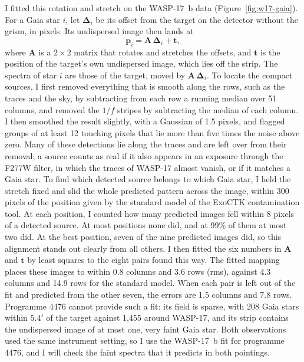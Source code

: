I fitted this rotation and stretch on the WASP-17~b data
(Figure~\ref{fig:w17-gaia}). For a Gaia star $i$, let
$\boldsymbol{\Delta}_i$ be its offset from the target on the detector without
the grism, in pixels. Its undispersed image then lands at
\begin{equation}
  \mathbf{p}_i = \mathbf{A}\,\boldsymbol{\Delta}_i + \mathbf{t},
  \label{eq:gaia-map}
\end{equation}
where $\mathbf{A}$ is a $2\times2$ matrix that rotates and stretches the
offsets, and $\mathbf{t}$ is the position of the target's own undispersed
image, which lies off the strip. The spectra of star $i$ are those of the
target, moved by $\mathbf{A}\,\boldsymbol{\Delta}_i$. To locate the compact
sources, I first removed everything that is smooth along the rows, such as
the traces and the sky, by subtracting from each row a running median over 51
columns, and removed the $1/f$ stripes by subtracting the median of each
column. I then smoothed the result slightly, with a Gaussian of 1.5 pixels,
and flagged groups of at least 12 touching pixels that lie more than five
times the noise above zero. Many of these detections lie along the traces and
are left over from their removal; a source counts as real if it also appears
in an exposure through the F277W filter, in which the traces of WASP-17
almost vanish, or if it matches a Gaia star. To find which detected source
belongs to which Gaia star, I held the stretch fixed and slid the whole
predicted pattern across the image, within 300 pixels of the position given
by the standard model of the ExoCTK contamination tool. At each position, I
counted how many predicted images fell within 8 pixels of a detected source.
At most positions none did, and at 99\% of them at most two did. At the best position, seven of the nine predicted images did, so this alignment stands out clearly from all others. I then fitted the six numbers in
$\mathbf{A}$ and $\mathbf{t}$ by least squares to the eight pairs found this
way. The fitted mapping places these images to within 0.8 columns and 3.6 rows
(rms), against 4.3 columns and 14.9 rows for the standard model. When each pair
is left out of the fit and predicted from the other seven, the errors are 1.5
columns and 7.8 rows. Programme 4476 cannot provide such a fit: its field is
sparse, with 208 Gaia stars within $5.4'$ of the target against 1,455 around
WASP-17, and its strip contains the undispersed image of at most one, very
faint Gaia star. Both observations used the same instrument setting, so I use
the WASP-17~b fit for programme 4476, and I will check the faint spectra that
it predicts in both pointings.

